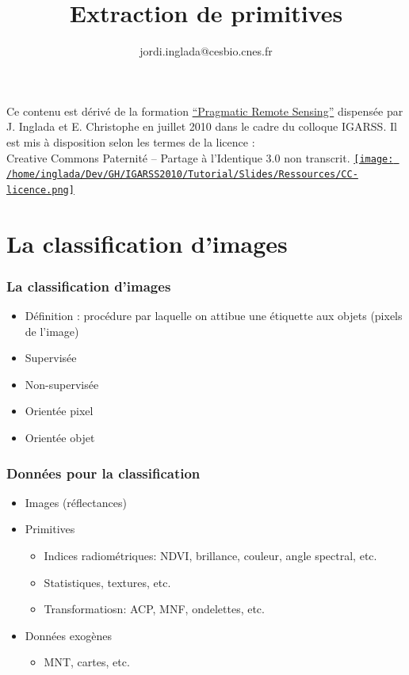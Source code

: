 \documentclass[compress]{beamer}
\title{Extraction de primitives}
\author
{jordi.inglada@cesbio.cnes.fr}
\institute[Cesbio] %
{\textsc{Centre d'Études Spatiales de la Biosphère, Toulouse, France}}
\date{}
\begin{document}
\begin{frame}
  \titlepage
  \begin{center}
{\tiny Ce contenu est dérivé de la formation \href{http://www.orfeo-toolbox.org/packages/PragmaticRemoteSensing-handout.pdf}{``Pragmatic Remote
  Sensing''} dispensée par J. Inglada et E. Christophe en juillet 2010
  dans le cadre du colloque IGARSS. Il est mis à disposition selon les termes de la licence :\\
Creative Commons Paternité – Partage à l’Identique 3.0 non transcrit.} \href{http://creativecommons.org/licenses/by-sa/3.0/}{\texttt{[image: /home/inglada/Dev/GH/IGARSS2010/Tutorial/Slides/Ressources/CC-licence.png]}}    
  \end{center}
\end{frame}


\section[Intro]{La classification d'images}
\begin{frame}
\frametitle{La classification d'images}
  \begin{itemize}
  \item Définition : procédure par laquelle on attibue une étiquette
    aux objets (pixels de l'image)
  \item Supervisée
  \item Non-supervisée
  \item Orientée pixel
  \item Orientée objet
  \end{itemize}
\end{frame}

\begin{frame}
  \frametitle{Données pour la classification}
  \begin{itemize}
  \item Images (réflectances)
  \item Primitives
    \begin{itemize}
    \item Indices radiométriques: NDVI, brillance, couleur, angle
      spectral, etc.
    \item Statistiques, textures, etc.
    \item Transformatiosn: ACP, MNF, ondelettes, etc.
    \end{itemize}
  \item Données exogènes
    \begin{itemize}
    \item MNT, cartes, etc.
    \end{itemize}
  \end{itemize}
\end{frame}
\end{document}
